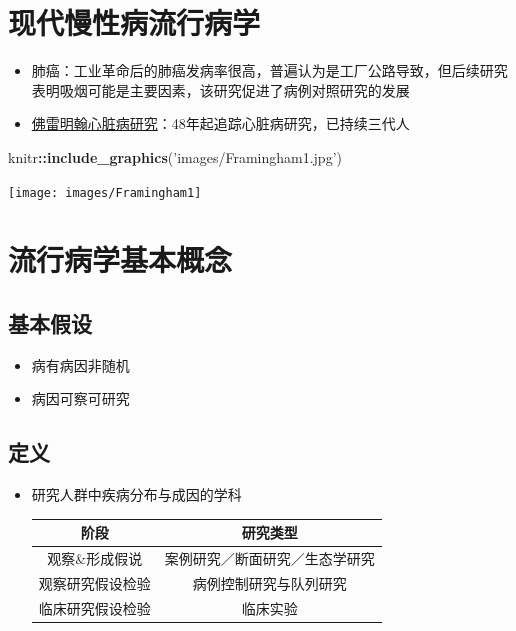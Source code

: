 \documentclass[
]{book}
\newenvironment{Shaded}{\begin{snugshade}}{\end{snugshade}}
\newcommand{\KeywordTok}[1]{\textcolor[rgb]{0.13,0.29,0.53}{\textbf{#1}}}
\newcommand{\NormalTok}[1]{#1}
\newcommand{\OperatorTok}[1]{\textcolor[rgb]{0.81,0.36,0.00}{\textbf{#1}}}
\newcommand{\StringTok}[1]{\textcolor[rgb]{0.31,0.60,0.02}{#1}}
\providecommand{\tightlist}{%
  \setlength{\itemsep}{0pt}\setlength{\parskip}{0pt}}
\begin{document}
\hypertarget{ux73b0ux4ee3ux6162ux6027ux75c5ux6d41ux884cux75c5ux5b66}{%
\section{现代慢性病流行病学}\label{ux73b0ux4ee3ux6162ux6027ux75c5ux6d41ux884cux75c5ux5b66}}

\begin{itemize}
\tightlist
\item
  肺癌：工业革命后的肺癌发病率很高，普遍认为是工厂公路导致，但后续研究表明吸烟可能是主要因素，该研究促进了病例对照研究的发展
\item
  \href{http://www.framinghamheartstudy.org/}{佛雷明翰心脏病研究}：48年起追踪心脏病研究，已持续三代人
\end{itemize}

\begin{Shaded}
\begin{Highlighting}[]
\NormalTok{knitr}\OperatorTok{::}\KeywordTok{include_graphics}\NormalTok{(}\StringTok{'images/Framingham1.jpg'}\NormalTok{)}
\end{Highlighting}
\end{Shaded}

\texttt{[image: images/Framingham1]}

\hypertarget{ux6d41ux884cux75c5ux5b66ux57faux672cux6982ux5ff5}{%
\section{流行病学基本概念}\label{ux6d41ux884cux75c5ux5b66ux57faux672cux6982ux5ff5}}

\hypertarget{ux57faux672cux5047ux8bbe}{%
\subsection{基本假设}\label{ux57faux672cux5047ux8bbe}}

\begin{itemize}
\tightlist
\item
  病有病因非随机
\item
  病因可察可研究
\end{itemize}

\hypertarget{ux5b9aux4e49}{%
\subsection{定义}\label{ux5b9aux4e49}}

\begin{itemize}
\item
  研究人群中疾病分布与成因的学科

  \begin{longtable}[]{@{}cc@{}}
  \toprule
  阶段 & 研究类型\tabularnewline
  \midrule
  \endhead
  观察\&形成假说 & 案例研究／断面研究／生态学研究\tabularnewline
  观察研究假设检验 & 病例控制研究与队列研究\tabularnewline
  临床研究假设检验 & 临床实验\tabularnewline
  \bottomrule
  \end{longtable}
\end{itemize}
\end{document}
